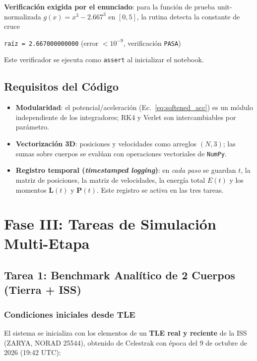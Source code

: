\documentclass[11pt, a4paper]{article}
\begin{document}
\textbf{Verificación exigida por el enunciado}: para la función de prueba unit-normalizada $g(x) = x^3 - 2.667^3$ en $[0, 5]$, la rutina detecta la constante de cruce
\begin{center}
	\texttt{raíz = 2.667000000000} \quad (error $< 10^{-9}$, verificación \texttt{PASA})
\end{center}
Este verificador se ejecuta como \texttt{assert} al inicializar el notebook.

\subsection{Requisitos del Código}

\begin{itemize}
	\item \textbf{Modularidad}: el potencial/aceleración (Ec.~\ref{eq:softened_acc}) es un módulo independiente de los integradores; RK4 y Verlet son intercambiables por parámetro.
	\item \textbf{Vectorización 3D}: posiciones y velocidades como arreglos $(N, 3)$; las sumas sobre cuerpos se evalúan con operaciones vectoriales de \texttt{NumPy}.
	\item \textbf{Registro temporal (\textit{timestamped logging})}: en \emph{cada paso} se guardan $t$, la matriz de posiciones, la matriz de velocidades, la energía total $E(t)$ y los momentos $\mathbf{L}(t)$ y $\mathbf{P}(t)$. Este registro se activa en las tres tareas.
\end{itemize}

\section{Fase III: Tareas de Simulación Multi-Etapa}

\subsection{Tarea 1: Benchmark Analítico de 2 Cuerpos (Tierra + ISS)}

\subsubsection{Condiciones iniciales desde TLE}
El sistema se inicializa con los elementos de un \textbf{TLE real y reciente} de la ISS (ZARYA, NORAD 25544), obtenido de Celestrak con época del 9 de octubre de 2026 (19:42 UTC):
\end{document}
